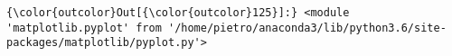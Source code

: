 \documentclass[11pt]{article}
\begin{document}
\begin{Verbatim}[commandchars=\\\{\}]
{\color{outcolor}Out[{\color{outcolor}125}]:} <module 'matplotlib.pyplot' from '/home/pietro/anaconda3/lib/python3.6/site-packages/matplotlib/pyplot.py'>
\end{Verbatim}
            
    \begin{center}
    \end{center}
    { \hspace*{\fill} \\}
    

    
    
    
    
\end{document}
